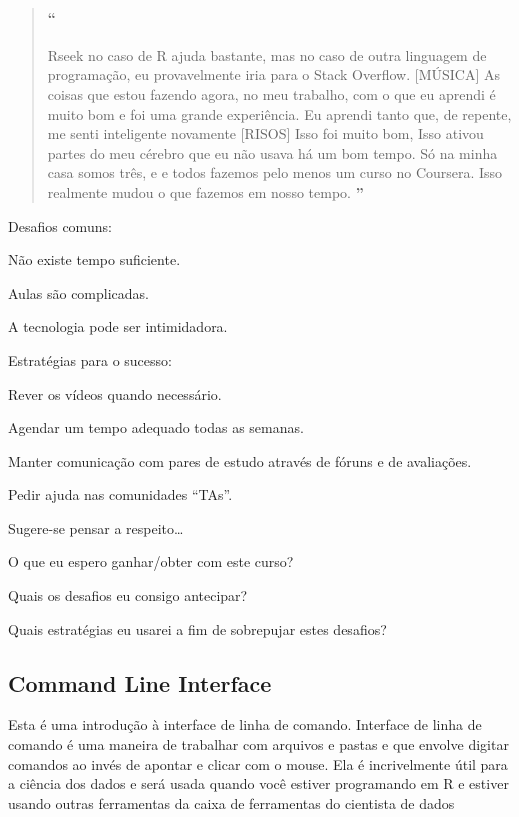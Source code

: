 \begin{quotation}
\begin{small}
\paragraph{``}
Rseek no caso de R ajuda bastante, mas no caso de outra linguagem de programação, eu provavelmente iria para o Stack Overflow. [MÚSICA] As coisas que estou fazendo agora, no meu trabalho, com o que eu aprendi é muito bom e foi uma grande experiência. Eu aprendi tanto que, de repente, me senti inteligente novamente [RISOS] Isso foi muito bom, Isso ativou partes do meu cérebro que eu não usava há um bom tempo. Só na minha casa somos três, e e todos fazemos pelo menos um curso no Coursera. Isso realmente mudou o que fazemos em nosso tempo.
{\large\textbf{''}}
\end{small}
\end{quotation}

Desafios comuns:
\begin{nenumerate}
\item Não existe tempo suficiente.
\item Aulas são complicadas.
\item A tecnologia pode ser intimidadora.
\end{nenumerate}

Estratégias para o sucesso:
\begin{nenumerate}
\item Rever os vídeos quando necessário.
\item Agendar um tempo adequado todas as semanas.
\item Manter comunicação com pares de estudo através de fóruns e de avaliações.
\item Pedir ajuda nas comunidades ``TAs''.
\end{nenumerate}

Sugere-se pensar a respeito\ldots{}
\begin{nenumerate}
\item O que eu espero ganhar/obter com este curso?
\item Quais os desafios eu consigo antecipar?
\item Quais estratégias eu usarei a fim de sobrepujar estes desafios?
\end{nenumerate}


\subsection{Command Line Interface}

Esta é uma introdução à interface de linha de comando. Interface de linha de comando é uma maneira de trabalhar com arquivos e pastas e que envolve digitar comandos ao invés de apontar e clicar com o mouse. Ela é incrivelmente útil para a ciência dos dados e será usada quando você estiver programando em R e estiver usando outras ferramentas da caixa de ferramentas do cientista de dados 

